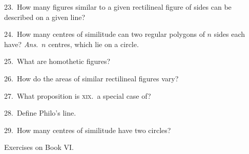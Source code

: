 \documentclass[oneside]{book}
\newcommand\exhead[1]{
\Needspace*{5\baselineskip}\begin{center}
\textsf{#1}
\end{center}
}
\begin{document}
\begin{footnotesize}
23.~How many figures similar to a given rectilineal figure of
sides can be described on a given line?

24.~How many centres of similitude can two regular polygons
of $n$ sides each have? \textit{Ans}.\ $n$ centres, which lie on a
circle.

25.~What are homothetic figures?

26.~How do the areas of similar rectilineal figures vary?

27.~What proposition is \textsc{xix}.\ a special case of?

28.~Define Philo's line.

29.~How many centres of similitude have two circles?
\par\end{footnotesize}


\exhead{Exercises on Book VI\@.}
\end{document}
